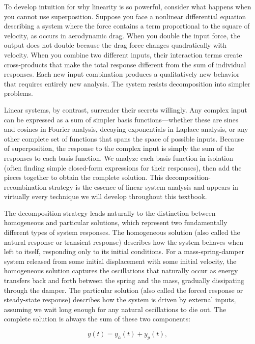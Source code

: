 To develop intuition for why linearity is so powerful, consider what happens when you cannot use superposition. Suppose you face a nonlinear differential equation describing a system where the force contains a term proportional to the square of velocity, as occurs in aerodynamic drag. When you double the input force, the output does not double because the drag force changes quadratically with velocity. When you combine two different inputs, their interaction terms create cross-products that make the total response different from the sum of individual responses. Each new input combination produces a qualitatively new behavior that requires entirely new analysis. The system resists decomposition into simpler problems.

Linear systems, by contrast, surrender their secrets willingly. Any complex input can be expressed as a sum of simpler basis functions—whether these are sines and cosines in Fourier analysis, decaying exponentials in Laplace analysis, or any other complete set of functions that spans the space of possible inputs. Because of superposition, the response to the complex input is simply the sum of the responses to each basis function. We analyze each basis function in isolation (often finding simple closed-form expressions for their responses), then add the pieces together to obtain the complete solution. This decomposition-recombination strategy is the essence of linear system analysis and appears in virtually every technique we will develop throughout this textbook.

The decomposition strategy leads naturally to the distinction between homogeneous and particular solutions, which represent two fundamentally different types of system responses. The homogeneous solution (also called the natural response or transient response) describes how the system behaves when left to itself, responding only to its initial conditions. For a mass-spring-damper system released from some initial displacement with some initial velocity, the homogeneous solution captures the oscillations that naturally occur as energy transfers back and forth between the spring and the mass, gradually dissipating through the damper. The particular solution (also called the forced response or steady-state response) describes how the system is driven by external inputs, assuming we wait long enough for any natural oscillations to die out. The complete solution is always the sum of these two components:

\begin{equation}
y(t) = y_h(t) + y_p(t),
\end{equation}

